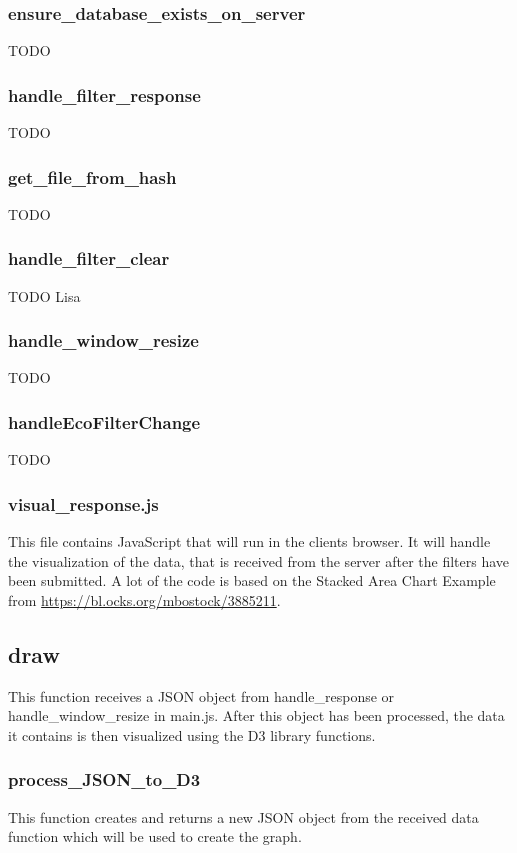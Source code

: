 \documentclass{article}
\begin{document}
\subsubsection*{ensure\_database\_exists\_on\_server}
TODO


\subsubsection*{handle\_filter\_response}
TODO


\subsubsection*{get\_file\_from\_hash}
TODO


\subsubsection*{handle\_filter\_clear}
TODO Lisa


\subsubsection*{handle\_window\_resize}
TODO


\subsubsection*{handleEcoFilterChange}
TODO


\subsubsection{visual\_response.js}
This file contains JavaScript that will run in the clients browser. It will handle the visualization of the data, that is received from the server after
the filters have been submitted. A lot of the code is based on the Stacked Area
Chart Example from \url{https://bl.ocks.org/mbostock/3885211}.

\subsection*{draw}
This function receives a JSON object from handle\_response or handle\_window\_resize in main.js. After this object has been processed, the data it contains is then visualized using the D3 library functions.

\subsubsection*{process\_JSON\_to\_D3}
This function creates and returns a new JSON object from the received data function which will be used to create the graph.
\end{document}
